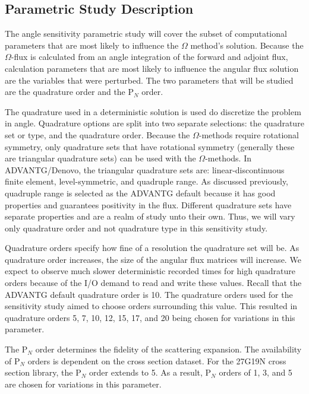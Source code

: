 \subsection{Parametric Study Description}
\label{subsec:parstudy}

The angle sensitivity parametric study will cover the subset of computational parameters
that are most likely to influence the $\Omega$ method's solution. Because the
$\Omega$-flux is calculated from an angle integration of the forward and adjoint
flux, calculation parameters that are most likely to influence the angular flux
solution are the variables that were perturbed.
The two parameters that will be studied
are the quadrature order and the P$_N$ order.

The quadrature used in a deterministic solution is used do discretize the
problem in angle. Quadrature options are split into two separate selections: the
quadrature set or type, and the quadrature order. Because the $\Omega$-methods
require rotational symmetry, only quadrature sets that have rotational
symmetry (generally these are triangular quadrature sets)
can be used with the $\Omega$-methods. In ADVANTG/Denovo, the triangular
quadrature sets are: linear-discontinuous finite element, level-symmetric, and
quadruple range. As discussed previously, quadruple range is selected as the
ADVANTG default because it has good properties and guarantees positivity in the
flux. Different quadrature sets have separate
properties and are a realm of study unto their own. Thus, we will vary only
quadrature order and not quadrature type in this sensitivity study.

Quadrature orders specify
how fine of a resolution the quadrature set will be. As quadrature order
increases, the size of the angular flux matrices will increase. We expect to
observe much slower deterministic recorded times for high quadrature orders
because of the I/O demand to read and write these values. Recall that the ADVANTG
default quadrature order is 10. The quadrature orders used for the sensitivity
study aimed to choose orders surrounding this value. This resulted in quadrature
orders 5, 7, 10, 12, 15, 17, and 20 being chosen for variations in this
parameter.

The P$_N$ order determines the fidelity of the scattering expansion. The
availability of P$_N$ orders is dependent on the cross section dataset. For the
27G19N cross section library, the P$_N$ order extends to 5. As a result,
P$_N$ orders of 1, 3, and 5 are chosen for variations in this parameter.

